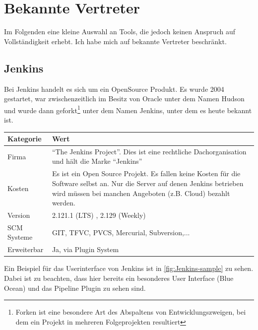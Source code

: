 \section{Bekannte Vertreter}
Im Folgenden eine kleine Auswahl an Tools, die jedoch keinen Anspruch auf Vollständigkeit erhebt. Ich habe mich auf bekannte Vertreter beschränkt.
\subsection{Jenkins}
Bei Jenkins handelt es sich um ein OpenSource Produkt. Es wurde 2004 gestartet, war zwischenzeitlich im Besitz von Oracle unter dem Namen Hudson und wurde dann geforkt\footnote{Forken ist eine besondere Art des Abspaltens von Entwicklungszweigen, bei dem ein Projekt in mehreren Folgeprojekten resultiert} unter dem Namen Jenkins, unter dem es heute bekannt ist. 
\begin{center}
  \begin{tabularx}{\textwidth}{lX}
    \toprule
    Kategorie & Wert \\
    \midrule
    Firma & "`The Jenkins Project"'. Dies ist eine rechtliche Dachorganisation und hält die Marke "`Jenkins"' \\
		\addlinespace
    Kosten & Es ist ein Open Source Projekt. Es fallen keine Kosten für die Software selbst an. Nur die Server auf denen Jenkins betrieben wird müssen bei manchen Angeboten (z.B. Cloud) bezahlt werden. \\
		\addlinespace
		Version & 2.121.1 (LTS) , 2.129 (Weekly) \\
		\addlinespace
		SCM Systeme & GIT, TFVC, PVCS, Mercurial, Subversion,...\\
		\addlinespace
		Erweiterbar & Ja, via Plugin System\\
    \bottomrule
  \end{tabularx}
\end{center}
Ein Beispiel für das Userinterface von Jenkins ist in \autoref{fig:Jenkins-sample} zu sehen. Dabei ist zu beachten, dass hier bereits ein besonderes User Interface (Blue Ocean) und das Pipeline Plugin zu sehen sind. 
